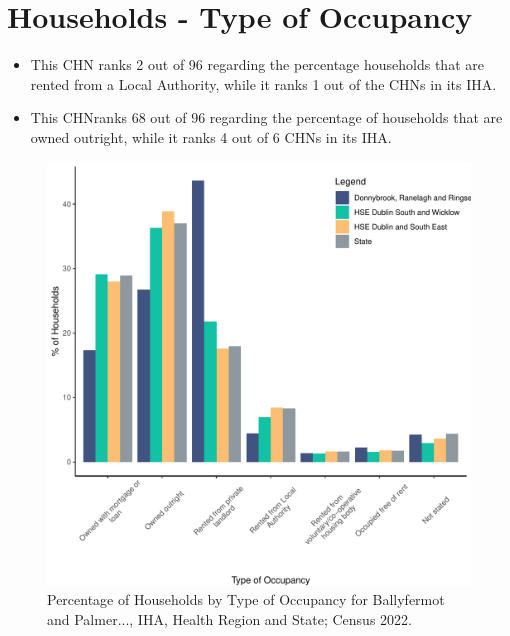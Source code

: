 \documentclass{article}
\begin{document}
\section{Households - Type of Occupancy}\label{sect:Households}
\begin{itemize}
\item This CHN ranks  2 out of 96 regarding the percentage households that are rented from a Local Authority, while it ranks  1 out of the CHNs in its IHA. 
\item This CHNranks  68 out of 96 regarding the percentage of households that are owned outright, while it ranks   4 out of 6 CHNs in its IHA.
\end{itemize}
\begin{figure}[H]
	\centering
	\includegraphics[width = 140mm]{../figures/HouseholdsED.pdf}
	\caption{Percentage of Households by Type of Occupancy for Ballyfermot and Palmer..., IHA, Health Region and State; Census 2022.}
	\label{fig:vbnv}
	\end{figure}
\end{document}
